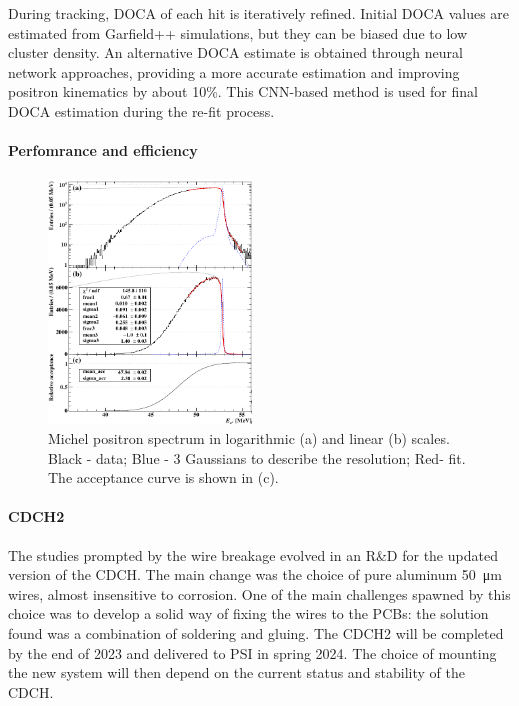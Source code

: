 \begin{refsection}
        \noindent
        During tracking, DOCA of each hit is iteratively refined. Initial DOCA values are estimated from Garfield++ simulations, but they can be biased due to low cluster density. 
        An alternative DOCA estimate is obtained through neural network approaches, providing a more accurate estimation and improving positron kinematics by about 10\%. 
        This CNN-based method is used for final DOCA estimation during the re-fit process.


        \paragraph{Perfomrance and efficiency}

        \begin{figure}
            \centering
            \includegraphics[width = 0.48\textwidth]{Figures/MEG/CDCH_michelfit.png}
            \caption{Michel positron spectrum in logarithmic (a) and linear (b) scales. Black - data; Blue - 3 Gaussians to describe the resolution; Red- fit. The acceptance curve is shown in (c).}
            \label{fig:MEGII:CDCH:michel}
        \end{figure}

        \paragraph{CDCH2} The studies prompted by the wire breakage evolved in an R\&D for the updated version of the CDCH. The main change was the choice of pure aluminum \SI{50}{\micro m} wires,  almost insensitive to corrosion.
        One of the main challenges spawned by this choice was to develop a solid way of fixing the wires to the PCBs: the solution found was a combination of soldering and gluing.
        The CDCH2 will be completed by the end of 2023 and delivered to PSI in spring 2024.
        The choice of mounting the new system will then depend on the current status and stability of the CDCH.


\end{refsection}
